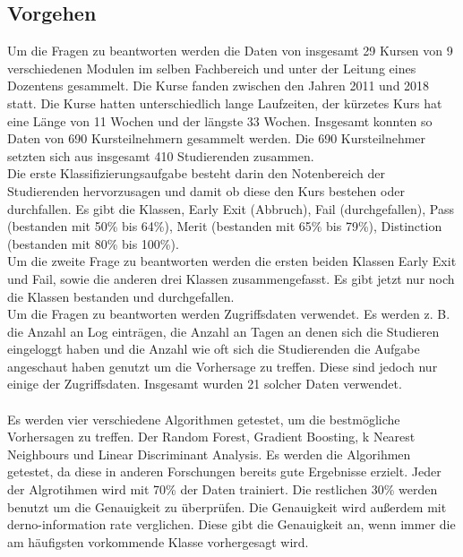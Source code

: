 \subsection{Vorgehen}
Um die Fragen zu beantworten werden die Daten von insgesamt 29 Kursen von 9 verschiedenen Modulen im selben Fachbereich und unter der Leitung eines Dozentens gesammelt.
Die Kurse fanden zwischen den Jahren 2011 und 2018 statt. Die Kurse hatten unterschiedlich lange Laufzeiten, der kürzetes Kurs hat eine Länge von 11 Wochen und der längste 33 Wochen.
Insgesamt konnten so Daten von 690 Kursteilnehmern gesammelt werden. Die 690 Kursteilnehmer setzten sich aus insgesamt 410 Studierenden zusammen. \cite[S. 6]{Quinn.2020}
\\
\noindent
Die erste Klassifizierungsaufgabe besteht darin den Notenbereich der Studierenden hervorzusagen und damit ob diese den Kurs bestehen oder durchfallen.
Es gibt die Klassen, Early Exit (Abbruch), Fail (durchgefallen), Pass (bestanden mit 50\% bis 64\%), Merit (bestanden mit 65\% bis 79\%), Distinction (bestanden mit 80\% bis 100\%). \cite[S. 6f]{Quinn.2020}
\\ \noindent
Um die zweite Frage zu beantworten werden die ersten beiden Klassen Early Exit und Fail, sowie die anderen drei Klassen zusammengefasst.
Es gibt jetzt nur noch die Klassen bestanden und durchgefallen. \cite[S. 6]{Quinn.2020}
\\
\noindent
Um die Fragen zu beantworten werden Zugriffsdaten verwendet. Es werden z. B. die Anzahl an Log einträgen, die Anzahl an Tagen an denen sich die Studieren eingeloggt haben und die Anzahl wie oft sich die Studierenden die Aufgabe angeschaut haben genutzt um die Vorhersage zu treffen.
Diese sind jedoch nur einige der Zugriffsdaten. Insgesamt wurden 21 solcher Daten verwendet. \cite[S. 7f]{Quinn.2020}
\\
\noindent
\\
\noindent
Es werden vier verschiedene Algorithmen getestet, um die bestmögliche Vorhersagen zu treffen. Der Random Forest, Gradient Boosting, k Nearest
Neighbours und Linear Discriminant Analysis. Es werden die Algorihmen getestet, da diese in anderen Forschungen bereits gute Ergebnisse erzielt.
Jeder der Algrotihmen wird mit 70\% der Daten trainiert. Die restlichen 30\% werden benutzt um die Genauigkeit zu überprüfen.
Die Genauigkeit wird außerdem mit der\glqq no-information rate\grqq{} verglichen. Diese gibt die Genauigkeit an, wenn immer die am häufigsten vorkommende Klasse vorhergesagt wird. \cite[S. 8f]{Quinn.2020}

